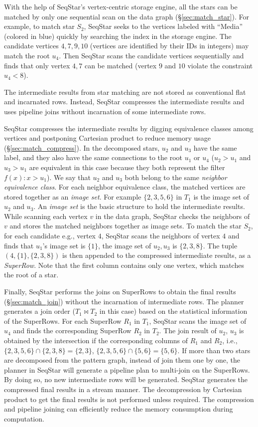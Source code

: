 With the help of SeqStar's vertex-centric storage engine,
all the stars can be matched by only one sequential scan on the data graph (\S\ref{sec:match_star}).
For example, to match star $S_2$,
SeqStar seeks to the vertices labeled with ``Media'' (colored in blue) quickly by searching the index in the storage engine.
The candidate vertices $4, 7, 9, 10$ (vertices are identified by their IDs in integers) may match the root $u_4$.
Then SeqStar scans the candidate vertices sequentially and finds that only vertex $4, 7$ can be matched (vertex $9$ and $10$ violate the constraint $u_4 < 8$).

The intermediate results from star matching are not stored as conventional flat and incarnated rows. Instead, SeqStar compresses the intermediate results and uses pipeline joins without incarnation of some intermediate rows.

SeqStar compresses the intermediate results by digging equivalence classes among vertices and postponing Cartesian product to reduce memory usage (\S\ref{sec:match_compress}).
In the decomposed stars, $u_2$ and $u_3$ have the same label, and they also have the same connections to the root $u_1$ or $u_4$ ($u_2 > u_1$ and $u_3 > u_1$ are equivalent in this case because they both represent the filter $f(x): x > u_1$).
We say that $u_2$ and $u_3$ both belong to the same \emph{neighbor equivalence class}.
For each neighbor equivalence class, the matched vertices are stored together as an \emph{image set}.
For example $\{2, 3, 5, 6\}$ in $T_1$ is the image set of $u_2$ and $u_3$.
An \emph{image set} is the basic structure to hold the intermediate results.
While scanning each vertex $v$ in the data graph,
SeqStar checks the neighbors of $v$ and stores the matched neighbors together as image sets.
To match the star $S_2$,
for each candidate e.g., vertex $4$, SeqStar scans the neighbors of vertex $4$ and finds that $u_1$'s image set is $\{1\}$,
the image set of $u_2, u_3$ is $\{2, 3, 8\}$.
The tuple $(4, \{1\}, \{2, 3, 8\})$ is then appended to the compressed intermediate results, as a \emph{SuperRow}.
Note that the first column contains only one vertex, which matches the root of a star.

Finally, SeqStar performs the joins on SuperRows to obtain the final results (\S\ref{sec:match_join}) without the incarnation of intermediate rows. The planner generates a join order ($T_1 \Join T_2$ in this case) based on the statistical information of the SuperRows.
For each SuperRow $R_1$ in $T_1$, SeqStar scans the image set of $u_4$ and finds the corresponding SuperRow $R_2$ in $T_2$.
The join result of $u_2$, $u_3$ is obtained by the intersection if the corresponding columns of $R_1$ and $R_2$,
i.e., $\{2, 3, 5, 6\} \cap \{2, 3, 8\} = \{2, 3\}$, $\{2, 3, 5, 6\} \cap \{5, 6\} = \{5, 6\}$.
If more than two stars are decomposed from the pattern graph,
instead of join them one by one,
the planner in SeqStar will generate a pipeline plan to multi-join on the SuperRows.
By doing so, no new intermediate rows will be generated.
SeqStar generates the compressed final results in a stream manner.
The decompression by Cartesian product to get the final results is not performed     unless required. The compression and pipeline joining can efficiently reduce the memory consumption during computation.

